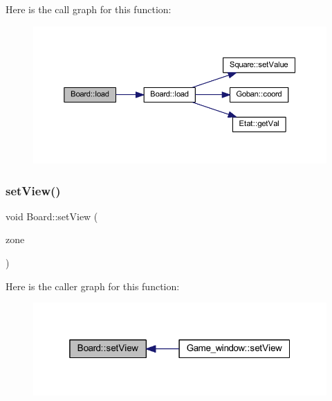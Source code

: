 Here is the call graph for this function\+:
\nopagebreak
\begin{figure}[H]
\begin{center}
\leavevmode
\includegraphics[width=350pt]{class_board_a3cea4df16e41c21666cf51789b7e9e78_cgraph}
\end{center}
\end{figure}
\mbox{\label{class_board_afb8c7e3266134506f024b29e08fef695}} 
\subsubsection{\texorpdfstring{set\+View()}{setView()}}
{\footnotesize\ttfamily void Board\+::set\+View (\begin{DoxyParamCaption}\item[{const sf\+::\+Float\+Rect \&}]{zone }\end{DoxyParamCaption})}

Here is the caller graph for this function\+:
\nopagebreak
\begin{figure}[H]
\begin{center}
\leavevmode
\includegraphics[width=319pt]{class_board_afb8c7e3266134506f024b29e08fef695_icgraph}
\end{center}
\end{figure}
\mbox{\label{class_board_a4450fe85fda29736cd835fed63d40a41}} 
